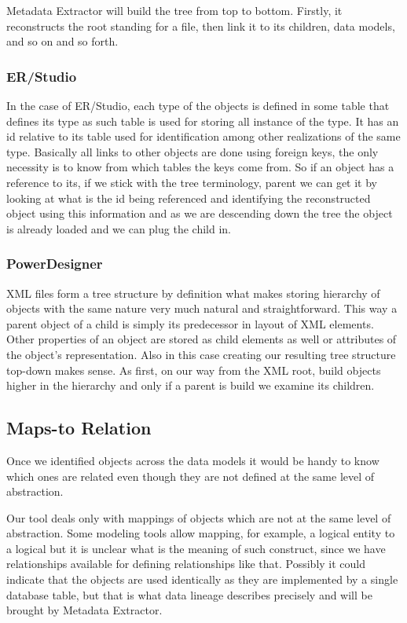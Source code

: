 Metadata Extractor will build the tree from top to bottom. Firstly, it reconstructs the root standing for a file, then link it to its children, data models, and so on and so forth.

\subsubsection{ER/Studio}

In the case of ER/Studio, each type of the objects is defined in some table that defines its type as such table is used for storing all instance of the type. It has an id relative to its table used for identification among other realizations of the same type. Basically all links to other objects are done using foreign keys, the only necessity is to know from which tables the keys come from. 
So if an object has a reference to its, if we stick with the tree terminology, parent we can get it by looking at what is the id being referenced and identifying the reconstructed object using this information and as we are descending down the tree the object is already loaded and we can plug the child in.

\subsubsection{PowerDesigner}

XML files form a tree structure by definition what makes storing hierarchy of objects with the same nature very much natural and straightforward. 
This way a parent object of a child is simply its predecessor in layout of XML elements. 
Other properties of an object are stored as child elements as well or attributes of the object's representation. 
Also in this case creating our resulting tree structure top-down makes sense. As first, on our way from the XML root, build objects higher in the hierarchy and only if a parent is build we examine its children.


\subsection{Maps-to Relation}
\label{maps_to_analysis}

Once we identified objects across the data models it would be handy  to know which ones are related even though they are not defined at the same level of abstraction.

Our tool deals only with mappings of objects which are not at the same level of abstraction. 
Some modeling tools allow mapping, for example, a logical entity to a logical but it is unclear what is the meaning of such construct, since we have relationships available for defining relationships like that. Possibly it could indicate that the objects are used identically as they are implemented by a single database table, but that is what data lineage describes precisely and will be brought by Metadata Extractor.

